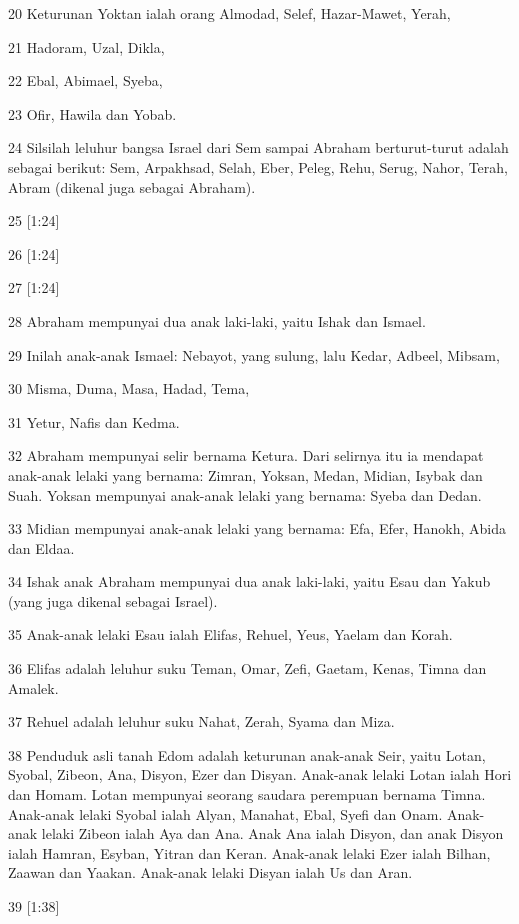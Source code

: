 \par 20 Keturunan Yoktan ialah orang Almodad, Selef, Hazar-Mawet, Yerah,
\par 21 Hadoram, Uzal, Dikla,
\par 22 Ebal, Abimael, Syeba,
\par 23 Ofir, Hawila dan Yobab.
\par 24 Silsilah leluhur bangsa Israel dari Sem sampai Abraham berturut-turut adalah sebagai berikut: Sem, Arpakhsad, Selah, Eber, Peleg, Rehu, Serug, Nahor, Terah, Abram (dikenal juga sebagai Abraham).
\par 25 [1:24]
\par 26 [1:24]
\par 27 [1:24]
\par 28 Abraham mempunyai dua anak laki-laki, yaitu Ishak dan Ismael.
\par 29 Inilah anak-anak Ismael: Nebayot, yang sulung, lalu Kedar, Adbeel, Mibsam,
\par 30 Misma, Duma, Masa, Hadad, Tema,
\par 31 Yetur, Nafis dan Kedma.
\par 32 Abraham mempunyai selir bernama Ketura. Dari selirnya itu ia mendapat anak-anak lelaki yang bernama: Zimran, Yoksan, Medan, Midian, Isybak dan Suah. Yoksan mempunyai anak-anak lelaki yang bernama: Syeba dan Dedan.
\par 33 Midian mempunyai anak-anak lelaki yang bernama: Efa, Efer, Hanokh, Abida dan Eldaa.
\par 34 Ishak anak Abraham mempunyai dua anak laki-laki, yaitu Esau dan Yakub (yang juga dikenal sebagai Israel).
\par 35 Anak-anak lelaki Esau ialah Elifas, Rehuel, Yeus, Yaelam dan Korah.
\par 36 Elifas adalah leluhur suku Teman, Omar, Zefi, Gaetam, Kenas, Timna dan Amalek.
\par 37 Rehuel adalah leluhur suku Nahat, Zerah, Syama dan Miza.
\par 38 Penduduk asli tanah Edom adalah keturunan anak-anak Seir, yaitu Lotan, Syobal, Zibeon, Ana, Disyon, Ezer dan Disyan. Anak-anak lelaki Lotan ialah Hori dan Homam. Lotan mempunyai seorang saudara perempuan bernama Timna. Anak-anak lelaki Syobal ialah Alyan, Manahat, Ebal, Syefi dan Onam. Anak-anak lelaki Zibeon ialah Aya dan Ana. Anak Ana ialah Disyon, dan anak Disyon ialah Hamran, Esyban, Yitran dan Keran. Anak-anak lelaki Ezer ialah Bilhan, Zaawan dan Yaakan. Anak-anak lelaki Disyan ialah Us dan Aran.
\par 39 [1:38]
